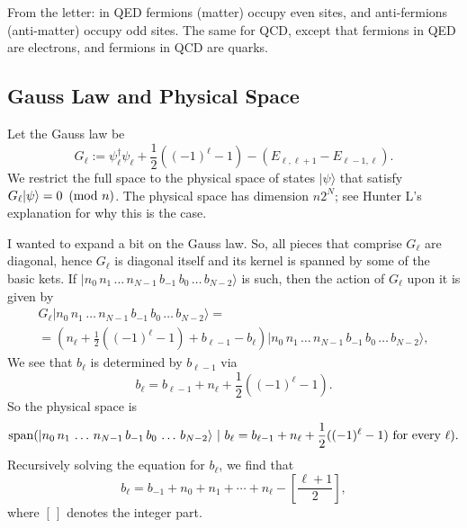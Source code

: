 	
	From the letter: in QED fermions (matter) occupy even sites, and anti-fermions (anti-matter) occupy odd sites. The same for QCD, except that fermions in QED are electrons, and fermions in QCD are quarks.
	
	\subsection{Gauss Law and Physical Space}
	Let the Gauss law be
		\begin{equation}\label{eq:1dQED_Gauss_law}
	G_\ell := \psi_\ell^\dagger \psi_\ell + \frac{1}{2}((-1)^\ell -1)-(E_{\ell,\ell+1}-E_{\ell-1,\ell}).
	\end{equation}
	We restrict the full space to the physical space of states $|\psi\rangle$ that satisfy
	$G_\ell|\psi\rangle= 0 \ \left(\mathrm{mod}\ n\right)$. 
	The physical space has dimension $n 2^N$; see Hunter L's explanation for why this is the case.
	
	I wanted to expand a bit on the Gauss law. So, all pieces that comprise $G_\ell$ are diagonal, hence $G_\ell$ is diagonal itself and its kernel is spanned by some of the basic kets. If $|n_0\, n_1\, \ldots \, n_{N-1} \, b_{-1}\, b_0\, \ldots\, b_{N-2}\rangle$ is such, then the action of $G_\ell$ upon it is given by
	\[\begin{split}
	G_\ell|n_0\, n_1\, \ldots \, n_{N-1} \, b_{-1}\, b_0\, \ldots\, b_{N-2}\rangle =\\= (n_{\ell} + \frac{1}{2}((-1)^\ell-1) + b_{\ell-1}-b_\ell) |n_0\, n_1\, \ldots \, n_{N-1} \, b_{-1}\, b_0\, \ldots\, b_{N-2}\rangle,
	\end{split}
	\]
We see that $b_\ell$ is determined by $b_{\ell-1}$ via
	\[
	b_\ell = b_{\ell-1} + n_{\ell} + \frac{1}{2}((-1)^\ell-1).
	\]
	So the physical space is 
	\[
	\Sp ( |n_0\, n_1\, \ldots \, n_{N-1} \, b_{-1}\, b_0\, \ldots\, b_{N-2}\rangle \ | \ b_{\ell} =b_{\ell-1} + n_{\ell} + \frac{1}{2}((-1)^\ell-1) \ \text{for every} \ \ell).
	\]
	Recursively solving the equation for $b_{\ell}$, we find that
	\[
	b_{\ell} = b_{-1} + n_0 + n_1 + \cdots + n_{\ell} - \left[\frac{\ell+1}{2}\right],
	\]
	where $[ \, ]$ denotes the integer part.
	
